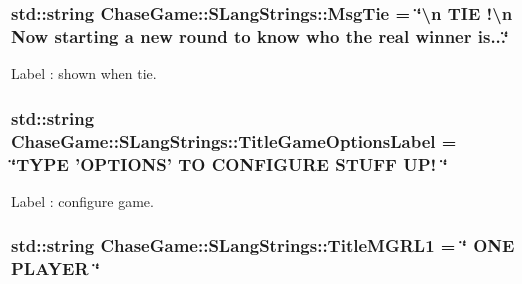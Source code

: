 \hypertarget{struct_chase_game_1_1_s_lang_strings_aedfc3595110c1d1da944d4ca35fc1510}{
\subsubsection[{Msg\-Tie}]{\setlength{\rightskip}{0pt plus 5cm}std\-::string Chase\-Game\-::\-S\-Lang\-Strings\-::\-Msg\-Tie = \char`\"{}\textbackslash{}n T\-I\-E !\textbackslash{}n Now starting a new round to know who the real winner is...\char`\"{}}}\label{struct_chase_game_1_1_s_lang_strings_aedfc3595110c1d1da944d4ca35fc1510}


Label \-: shown when tie. 

\hypertarget{struct_chase_game_1_1_s_lang_strings_acf93994343367490b65893186e3d37eb}{
\subsubsection[{Title\-Game\-Options\-Label}]{\setlength{\rightskip}{0pt plus 5cm}std\-::string Chase\-Game\-::\-S\-Lang\-Strings\-::\-Title\-Game\-Options\-Label = \char`\"{}T\-Y\-P\-E 'O\-P\-T\-I\-O\-N\-S' T\-O C\-O\-N\-F\-I\-G\-U\-R\-E S\-T\-U\-F\-F U\-P! \char`\"{}}}\label{struct_chase_game_1_1_s_lang_strings_acf93994343367490b65893186e3d37eb}


Label \-: configure game. 

\hypertarget{struct_chase_game_1_1_s_lang_strings_abdd2628446dc68073ab903fa6516747c}{
\subsubsection[{Title\-M\-G\-R\-L1}]{\setlength{\rightskip}{0pt plus 5cm}std\-::string Chase\-Game\-::\-S\-Lang\-Strings\-::\-Title\-M\-G\-R\-L1 = \char`\"{} O\-N\-E P\-L\-A\-Y\-E\-R \char`\"{}}}\label{struct_chase_game_1_1_s_lang_strings_abdd2628446dc68073ab903fa6516747c}



